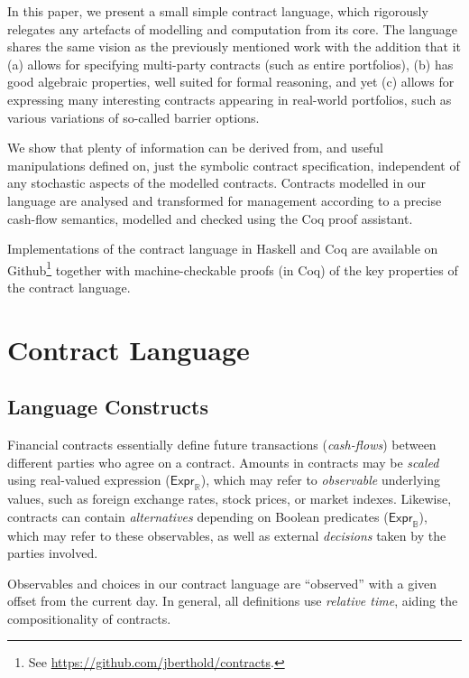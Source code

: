 \documentclass[a4paper,debug,twocolumn]{easychair}
\newcommand\type[1]{\mathsf{#1}}
\newcommand\reals{{\mathbb R}}
\newcommand\bools{{\mathbb B}}
\theoremstyle{plain}
\begin{document}
In this paper, we present a small simple contract language, which
rigorously relegates any artefacts of modelling and computation from
its core. The language shares the same vision as the previously
mentioned work with the addition that it (a) allows for specifying
multi-party contracts (such as entire portfolios), (b) has good
algebraic properties, well suited for formal reasoning, and yet (c)
allows for expressing many interesting contracts appearing in
real-world portfolios, such as various variations of so-called barrier
options.

We show that plenty of information can be derived from, and useful
manipulations defined on, just the symbolic contract specification,
independent of any stochastic aspects of the modelled contracts.
Contracts modelled in our language are analysed and transformed for
management according to a precise cash-flow semantics, modelled and
checked using the Coq proof assistant.

Implementations of the contract language in Haskell and Coq are
available on Github\footnote{See
  \url{https://github.com/jberthold/contracts}.} together with
machine-checkable proofs (in Coq) of the key properties of the
contract language.

\section{Contract Language}
\label{sec:contract-language}

\subsection{Language Constructs}
\label{sec:language-constructs}

Financial contracts essentially define future transactions (\emph{cash-flows})
between different parties who agree on a contract.
Amounts in contracts may be \emph{scaled} using real-valued expression
($\type{Expr}_\reals$), which may refer to \emph{observable} underlying
values, such as foreign exchange rates, stock prices, or market indexes.
Likewise, contracts can contain \emph{alternatives} depending on Boolean
predicates ($\type{Expr}_\bools$), which may refer to these observables,
as well as external \emph{decisions} taken by the parties involved.

Observables and choices in our contract language are ``observed'' with
a given offset from the current day.
In general, all definitions use \emph{relative time},
aiding the compositionality of contracts.  
\end{document}
